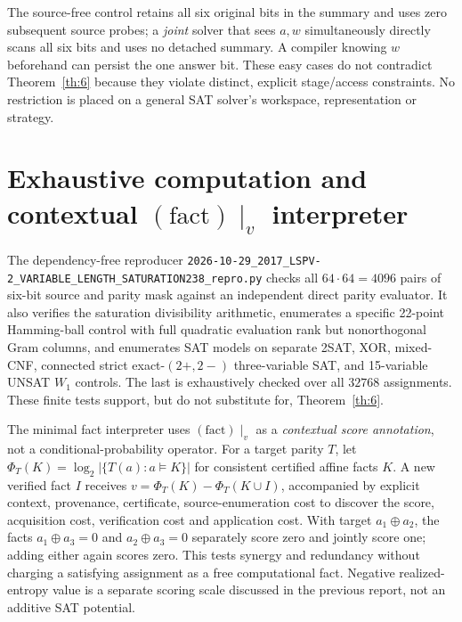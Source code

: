 \documentclass[10pt]{article}
\begin{document}
The source-free control retains all six original bits in the summary and uses zero subsequent source probes; a \emph{joint} solver that sees \(a,w\) simultaneously directly scans all six bits and uses no detached summary. A compiler knowing \(w\) beforehand can persist the one answer bit. These easy cases do not contradict Theorem~\ref{th:6} because they violate distinct, explicit stage/access constraints. No restriction is placed on a general SAT solver's workspace, representation or strategy.

\section{Exhaustive computation and contextual $(\mathrm{fact})\mid_v$ interpreter}
The dependency-free reproducer \texttt{2026-10-29\_2017\_LSPV-2\_VARIABLE\_LENGTH\_SATURATION238\_repro.py} checks all \(64\cdot64=4096\) pairs of six-bit source and parity mask against an independent direct parity evaluator. It also verifies the saturation divisibility arithmetic, enumerates a specific 22-point Hamming-ball control with full quadratic evaluation rank but nonorthogonal Gram columns, and enumerates SAT models on separate 2SAT, XOR, mixed-CNF, connected strict exact-$(2+,2-)$ three-variable SAT, and 15-variable UNSAT \(W_1\) controls. The last is exhaustively checked over all \(32768\) assignments. These finite tests support, but do not substitute for, Theorem~\ref{th:6}.

The minimal fact interpreter uses \((\mathrm{fact})\mid_v\) as a \emph{contextual score annotation}, not a conditional-probability operator. For a target parity \(T\), let \(\Phi_T(K)=\log_2|\{T(a):a\models K\}|\) for consistent certified affine facts \(K\). A new verified fact \(I\) receives \(v=\Phi_T(K)-\Phi_T(K\cup I)\), accompanied by explicit context, provenance, certificate, source-enumeration cost to discover the score, acquisition cost, verification cost and application cost. With target \(a_1\oplus a_2\), the facts \(a_1\oplus a_3=0\) and \(a_2\oplus a_3=0\) separately score zero and jointly score one; adding either again scores zero. This tests synergy and redundancy without charging a satisfying assignment as a free computational fact. Negative realized-entropy value is a separate scoring scale discussed in the previous report, not an additive SAT potential.
\end{document}
